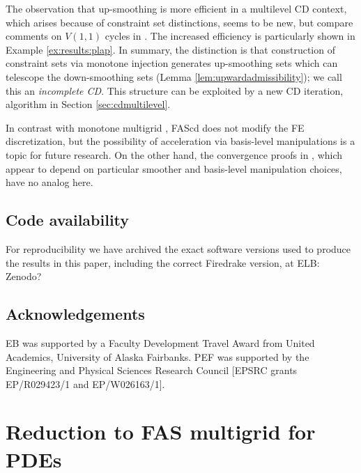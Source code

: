 \documentclass[letterpaper,final,12pt,reqno]{amsart}
\theoremstyle{cstyle}
\theoremstyle{cstyle*}
\theoremstyle{dstyle}
\numberwithin{equation}{section}
\numberwithin{figure}{section}
\numberwithin{table}{section}
\numberwithin{theorem}{section}
\begin{document}
The observation that up-smoothing is more efficient in a multilevel CD context, which arises because of constraint set distinctions, seems to be new, but compare comments on $V(1,1)$ cycles in \cite{GraeserKornhuber2009,Tai2003}.  The increased efficiency is particularly shown in Example \ref{ex:results:plap}.  In summary, the distinction is that construction of constraint sets via monotone injection generates up-smoothing sets which can telescope the down-smoothing sets (Lemma \ref{lem:upwardadmissibility}); we call this an \emph{incomplete CD}.  This structure can be exploited by a new CD iteration, algorithm  in Section \ref{sec:cdmultilevel}.

In contrast with monotone multigrid \cite{Kornhuber1994}, FAScd does not modify the FE discretization, but the possibility of acceleration via basis-level manipulations is a topic for future research.  On the other hand,  the convergence proofs in \cite{GraeserKornhuber2009,Kornhuber1994}, which appear to depend on particular smoother and basis-level manipulation choices, have no analog here.



\subsection*{Code availability} \label{sec:code}  For reproducibility we have archived the exact software versions used to produce the results in this paper, including the correct Firedrake version, at {\color{blue} ELB: Zenodo?}

\subsection*{Acknowledgements} \label{sec:acknowledgements}  EB was supported by a Faculty Development Travel Award from United Academics, University of Alaska Fairbanks. PEF was supported by the Engineering and Physical Sciences Research Council [EPSRC grants EP/R029423/1 and EP/W026163/1].






\appendix
\section{Reduction to FAS multigrid for PDEs} \label{app:reductions}
\end{document}
